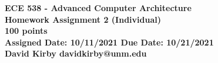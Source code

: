 \documentclass[addpoints,11pt]{exam}
\begin{document}
\setmonofont{SF Mono}

\begin{center}
 	\large\bfseries ECE 538 - Advanced Computer Architecture\\
    Homework Assignment 2 (Individual)\\[1em]
    100 points\\[1em]
    Assigned Date: \textnormal{10/11/2021} Due Date: \textnormal{10/21/2021}\\[5em]
    David Kirby \quad davidkirby@unm.edu
    \end{center}
    \pagestyle{headandfoot}
    \firstpagefooter{}{\thepage}{}
    \runningfooter{}{\thepage}{}
    \newpage
\end{document}
